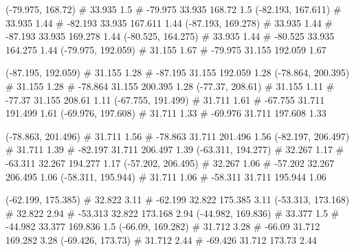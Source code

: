 \documentclass[a4paper,openbib,10pt]{article}
\newenvironment{treegraph}{\begin{graph}}{\end{graph}}
\begin{document}
\begin{treegraph}
  (-79.975, 168.72) #     33.935    1.5
   #    -79.975    33.935    168.72    1.5
  (-82.193, 167.611) #     33.935    1.44
   #    -82.193    33.935    167.611    1.44
  (-87.193, 169.278) #     33.935    1.44
   #    -87.193    33.935    169.278    1.44
  (-80.525, 164.275) #     33.935    1.44
   #    -80.525    33.935    164.275    1.44
  (-79.975, 192.059) #     31.155    1.67
   #    -79.975    31.155    192.059    1.67

  (-87.195, 192.059) #     31.155    1.28
   #    -87.195    31.155    192.059    1.28
  (-78.864, 200.395) #     31.155    1.28
   #    -78.864    31.155    200.395    1.28
  (-77.37, 208.61) #     31.155    1.11
   #    -77.37    31.155    208.61    1.11
  (-67.755, 191.499) #     31.711    1.61
   #    -67.755    31.711    191.499    1.61
  (-69.976, 197.608) #     31.711    1.33
   #    -69.976    31.711    197.608    1.33

  (-78.863, 201.496) #     31.711    1.56
   #    -78.863    31.711    201.496    1.56
  (-82.197, 206.497) #     31.711    1.39
   #    -82.197    31.711    206.497    1.39
  (-63.311, 194.277) #     32.267    1.17
   #    -63.311    32.267    194.277    1.17
  (-57.202, 206.495) #     32.267    1.06
   #    -57.202    32.267    206.495    1.06
  (-58.311, 195.944) #     31.711    1.06
   #    -58.311    31.711    195.944    1.06

  (-62.199, 175.385) #     32.822    3.11
   #    -62.199    32.822    175.385    3.11
  (-53.313, 173.168) #     32.822    2.94
   #    -53.313    32.822    173.168    2.94
  (-44.982, 169.836) #     33.377    1.5
   #    -44.982    33.377    169.836    1.5
  (-66.09, 169.282) #     31.712    3.28
   #    -66.09    31.712    169.282    3.28
  (-69.426, 173.73) #     31.712    2.44
   #    -69.426    31.712    173.73    2.44


\end{treegraph}
\end{document}
